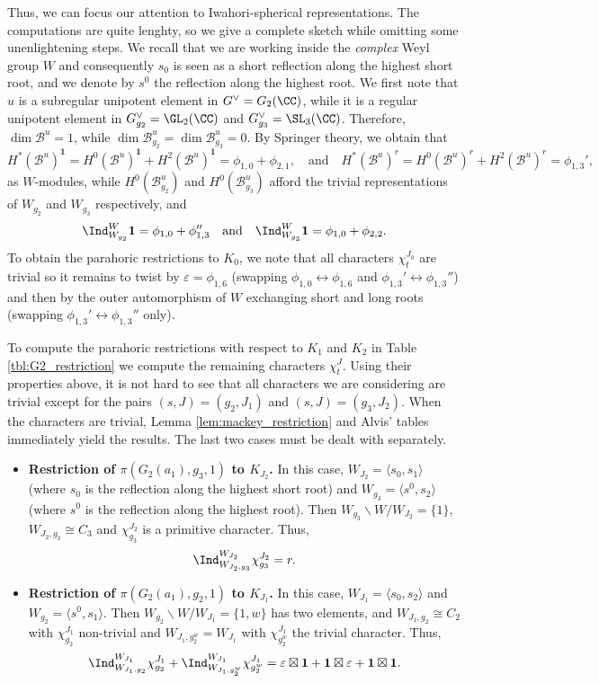 Thus, we can focus our attention to Iwahori-spherical representations. The computations are quite lenghty, so we give a complete sketch while omitting some unenlightening steps. We recall that we are working inside the \textit{complex} Weyl group $W$ and consequently $s_0$ is seen as a short reflection along the highest short root, and we denote by $s^0$ the reflection along the highest root. We first note that $u$ is a subregular unipotent element in $G^\vee=G_2(\CC)$, while it is a regular unipotent element in $G^\vee_{g_2}=\GL_2(\CC)$ and $G^\vee_{g_3}=\SL_3(\CC)$. Therefore, $\dim\mathcal{B}^u=1$, while $\dim\mathcal{B}_{g_2}^u=\dim\mathcal{B}_{g_3}^u=0$. By Springer theory, we obtain that 
$$H^*(\mathcal{B}^u)^\mathbf{1}=H^0(\mathcal{B}^u)^\mathbf{1}+H^2(\mathcal{B}^u)^\mathbf{1}=\phi_{1,0}+\phi_{2,1},\quad\text{and}\quad H^*(\mathcal{B}^u)^r=H^0(\mathcal{B}^u)^r+H^2(\mathcal{B}^u)^r=\phi_{1,3}',$$
as $W$-modules, while $H^0(\mathcal{B}_{g_2}^u)$ and $H^0(\mathcal{B}_{g_3}^u)$ afford the trivial representations of $W_{g_2}$ and $W_{g_3}$ respectively, and
$$\Ind_{W_{g_2}}^W\mathbf{1}=\phi_{1,0}+\phi_{1,3}''\quad\text{and}\quad\Ind_{W_{g_3}}^W\mathbf{1}=\phi_{1,0}+\phi_{2,2}.$$
To obtain the parahoric restrictions to $K_0$, we note that all characters $\chi_t^{J_0}$ are trivial so it remains to twist by $\varepsilon=\phi_{1,6}$ (swapping $\phi_{1,0}\leftrightarrow\phi_{1,6}$ and $\phi_{1,3}'\leftrightarrow\phi_{1,3}''$) and then by the outer automorphism of $W$ exchanging short and long roots (swapping $\phi_{1,3}'\leftrightarrow\phi_{1,3}''$ only). 

To compute the parahoric restrictions with respect to $K_1$ and $K_2$ in Table \ref{tbl:G2_restriction} we compute the remaining characters $\chi_t^J$. Using their properties above, it is not hard to see that all characters we are considering are trivial except for the pairs $(s,J)=(g_2,J_1)$ and $(s,J)=(g_3,J_2)$. When the characters are trivial, Lemma \ref{lem:mackey_restriction} and Alvis' tables immediately yield the results. The last two cases must be dealt with separately.
\begin{itemize}
    \item \textbf{Restriction of $\pi(G_2(a_1),g_3,1)$ to $K_{J_2}$.} In this case, $W_{J_2}=\langle s_0,s_1\rangle$ (where $s_0$ is the reflection along the highest short root) and $W_{g_3}=\langle s^0,s_2\rangle$ (where $s^0$ is the reflection along the highest root). Then $W_{g_3}\backslash W/W_{J_2}=\{1\}$, $W_{J_2,g_3}\cong C_3$ and $\chi_{g_3}^{J_2}$ is a primitive character. Thus, 
    $$\Ind_{W_{J_2,g_3}}^{W_{J_2}}\chi_{g_3}^{J_2}=r.$$ 
    \item \textbf{Restriction of $\pi(G_2(a_1),g_2,1)$ to $K_{J_1}$.} In this case, $W_{J_1}=\langle s_0,s_2\rangle$ and $W_{g_2}=\langle s^0,s_1\rangle$. Then $W_{g_2}\backslash W/W_{J_1}=\{1,w\}$ has two elements, and $W_{J_1,g_2}\cong C_2$ with $\chi_{g_2}^{J_1}$ non-trivial and $W_{J_1,g_2^w}=W_{J_1}$ with $\chi_{g_2^w}^{J_1}$ the trivial character. Thus,
    $$\Ind_{W_{J_1,g_2}}^{W_{J_1}}\chi_{g_2}^{J_1}+\Ind_{W_{J_1,g_2^w}}^{W_{J_1}}\chi_{g_2^w}^{J_1}=\varepsilon\boxtimes\mathbf{1}+\mathbf{1}\boxtimes\varepsilon+\mathbf{1}\boxtimes\mathbf{1}.$$ 
\end{itemize}

